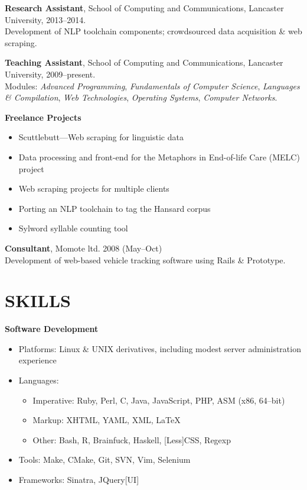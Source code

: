 \documentclass{res}
\begin{document}
\begin{resume}
    {\bf Research Assistant}, 
    School of Computing and Communications, 
    Lancaster University, 
    2013--2014.\\
    Development of NLP toolchain components; crowdsourced data acquisition \& web scraping.

    {\bf Teaching Assistant}, 
    School of Computing and Communications, 
    Lancaster University, 
    2009--present.\\
    Modules: \textsl{Advanced Programming}, \textsl{Fundamentals of Computer Science}, \textsl{Languages \& Compilation}, \textsl{Web Technologies}, \textsl{Operating Systems}, \textsl{Computer Networks}.

    {\bf Freelance Projects} 
    \begin{itemize}
        \item Scuttlebutt---Web scraping for linguistic data
        \item Data processing and front-end for the Metaphors in End-of-life Care (MELC) project
        \item Web scraping projects for multiple clients
        \item Porting an NLP toolchain to tag the Hansard corpus
        \item Sylword syllable counting tool
    \end{itemize}
    
    {\bf Consultant}, 
    Momote ltd.
    2008 (May--Oct)\\
    Development of web-based vehicle tracking software using Rails \& Prototype.



 
\section{SKILLS} 
\vspace{0.1in}

   {\bf Software Development} 
        \begin{itemize}
            \item[] Platforms: Linux \& UNIX derivatives, including modest server administration experience
            \item[] Languages:
                \begin{itemize}
                    \item Imperative: Ruby, Perl, C, Java, JavaScript, PHP, ASM (x86, 64--bit)
                    \item Markup: XHTML, YAML, XML, \LaTeX
                    \item Other: Bash, R, Brainfuck, Haskell, [Less]CSS, Regexp
                \end{itemize}
            \item[] Tools: Make, CMake, Git, SVN, Vim, Selenium
            \item[] Frameworks: Sinatra, JQuery[UI]
        \end{itemize}


\end{resume}
\end{document}
